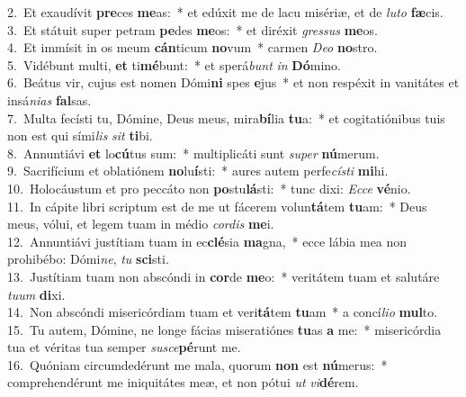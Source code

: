 {2.~}Et exaudívit \textbf{pre}ces \textbf{me}as:~* et edúxit me de lacu misériæ, et de \textit{lu}\textit{to} \textbf{fæ}cis.\\
{3.~}Et státuit super petram \textbf{pe}des \textbf{me}os:~* et diréxit \textit{gres}\textit{sus} \textbf{me}os.\\
{4.~}Et immísit in os meum \textbf{cán}ticum \textbf{no}vum~* carmen \textit{De}\textit{o} \textbf{no}stro.\\
{5.~}Vidébunt multi, \textbf{et} ti\textbf{mé}bunt:~* et sperá\textit{bunt} \textit{in} \textbf{Dó}mino.\\
{6.~}Beátus vir, cujus est nomen Dómi\textbf{ni} spes \textbf{e}jus~* et non respéxit in vanitátes et insá\textit{ni}\textit{as} \textbf{fal}sas.\\
{7.~}Multa fecísti tu, Dómine, Deus meus, mira\textbf{bí}lia \textbf{tu}a:~* et cogitatiónibus tuis non est qui sími\textit{lis} \textit{sit} \textbf{ti}bi.\\
{8.~}Annuntiávi \textbf{et} lo\textbf{cú}tus sum:~* multiplicáti sunt \textit{su}\textit{per} \textbf{nú}merum.\\
{9.~}Sacrifícium et oblatiónem \textbf{no}lu\textbf{í}sti:~* aures autem perfe\textit{cí}\textit{sti} \textbf{mi}hi.\\
{10.~}Holocáustum et pro peccáto non \textbf{po}stu\textbf{lá}sti:~* tunc dixi: \textit{Ec}\textit{ce} \textbf{vé}nio.\\
{11.~}In cápite libri scriptum est de me ut fácerem volun\textbf{tá}tem \textbf{tu}am:~* Deus meus, vólui, et legem tuam in médio \textit{cor}\textit{dis} \textbf{me}i.\\
{12.~}Annuntiávi justítiam tuam in ec\textbf{clé}sia \textbf{ma}gna,~* ecce lábia mea non prohibébo: Dómi\textit{ne}, \textit{tu} \textbf{sci}sti.\\
{13.~}Justítiam tuam non abscóndi in \textbf{cor}de \textbf{me}o:~* veritátem tuam et salutáre \textit{tu}\textit{um} \textbf{di}xi.\\
{14.~}Non abscóndi misericórdiam tuam et veri\textbf{tá}tem \textbf{tu}am~* a concí\textit{li}\textit{o} \textbf{mul}to.\\
{15.~}Tu autem, Dómine, ne longe fácias miseratiónes \textbf{tu}as \textbf{a} me:~* misericórdia tua et véritas tua semper \textit{su}\textit{sce}\textbf{pé}runt me.\\
{16.~}Quóniam circumdedérunt me mala, quorum \textbf{non} est \textbf{nú}merus:~* comprehendérunt me iniquitátes meæ, et non pótui \textit{ut} \textit{vi}\textbf{dé}rem.\\
